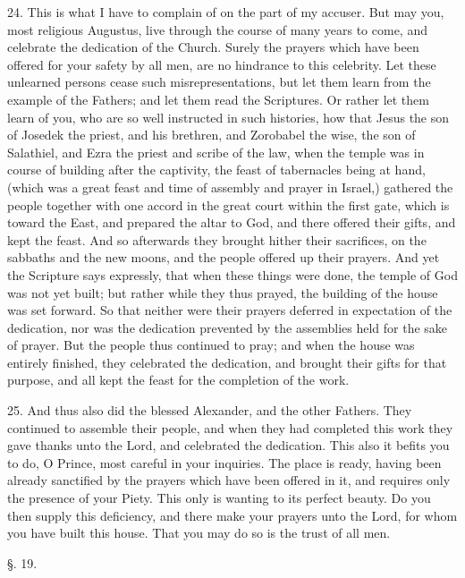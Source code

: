 24. This is what I have to complain of on the part of my accuser. But
may you, most religious Augustus, live through the course of many
years to come, and celebrate the dedication of the Church. Surely the
prayers which have been offered for your safety by all men, are no
hindrance to this celebrity. Let these unlearned persons cease such
misrepresentations, but let them learn from the example of the
Fathers; and let them read the Scriptures. Or rather let them learn of
you, who are so well instructed in such histories, how that Jesus the
son of Josedek the priest, and his brethren, and Zorobabel the wise,
the son of Salathiel, and Ezra the priest and scribe of the law, when
the temple was in course of building after the captivity, the feast of
tabernacles being at hand, (which was a great feast and time of
assembly and prayer in Israel,) gathered the people together with one
accord in the great court within the first gate, which is toward the
East, and prepared the altar to God, and there offered their gifts,
and kept the feast. And so afterwards they brought hither their
sacrifices, on the sabbaths and the new moons, and the people offered
up their prayers. And yet the Scripture says expressly, that when
these things were done, the temple of God was not yet built; but
rather while they thus prayed, the building of the house was set
forward. So that neither were their prayers deferred in expectation of
the dedication, nor was the dedication prevented by the assemblies
held for the sake of prayer. But the people thus continued to pray;
and when the house was entirely finished, they celebrated the
dedication, and brought their gifts for that purpose, and all kept the
feast for the completion of the work.

25. And thus also did the blessed Alexander, and the other Fathers. They
continued to assemble their people, and when they had completed this
work they gave thanks unto the Lord, and celebrated the dedication.
This also it befits you to do, O Prince, most careful in your
inquiries. The place is ready, having been already sanctified by the
prayers which have been offered in it, and requires only the presence
of your Piety. This only is wanting to its perfect beauty. Do
you then supply this deficiency, and there make your prayers unto the
Lord, for whom you have built this house. That you may do so is the
trust of all men.

§. 19.

